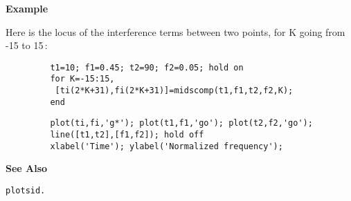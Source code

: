 {\bf \large \sf Example}\\
\hspace*{1.5cm}
\begin{minipage}[t]{13.5cm}
Here is the locus of the interference terms between two points, for {\ty K} going
from -15 to 15\,:
\begin{verbatim}
         t1=10; f1=0.45; t2=90; f2=0.05; hold on
         for K=-15:15,
          [ti(2*K+31),fi(2*K+31)]=midscomp(t1,f1,t2,f2,K);
         end
\end{verbatim}
\end{minipage}
\hspace*{1.5cm}
\begin{minipage}[t]{13.5cm}
\begin{verbatim}
         plot(ti,fi,'g*'); plot(t1,f1,'go'); plot(t2,f2,'go');
         line([t1,t2],[f1,f2]); hold off
         xlabel('Time'); ylabel('Normalized frequency');
\end{verbatim}
\end{minipage}
\vspace*{.5cm}


{\bf \large \sf See Also}\\
\hspace*{1.5cm}
\begin{minipage}[t]{13.5cm}
\begin{verbatim}
plotsid.
\end{verbatim}
\end{minipage}

